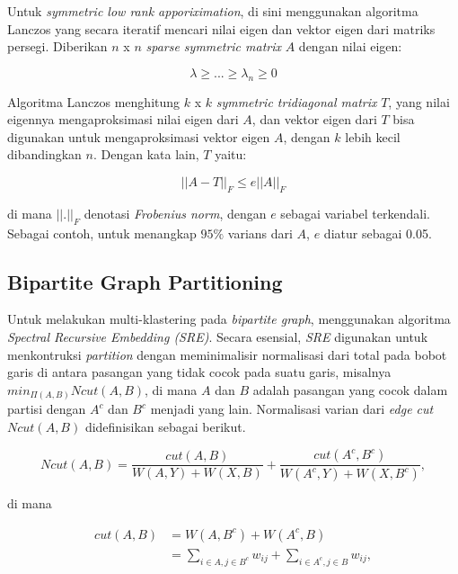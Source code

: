 Untuk \textit{symmetric low rank apporiximation}, di sini menggunakan algoritma Lanczos yang secara iteratif mencari nilai eigen dan vektor eigen dari matriks persegi. Diberikan $n$ x $n$ \textit{sparse symmetric matrix} $A$ dengan nilai eigen:

\begin{equation}
\label{lambda_lambda}
    \lambda \geq ... \geq \lambda_n \geq 0
\end{equation}

Algoritma Lanczos menghitung $k$ x $k$ \textit{symmetric tridiagonal matrix} $T$, yang nilai eigennya mengaproksimasi nilai eigen dari $A$, dan vektor eigen dari $T$ bisa digunakan untuk mengaproksimasi vektor eigen $A$, dengan $k$ lebih kecil dibandingkan $n$. Dengan kata lain, $T$ yaitu:

\begin{equation}
\label{frobenius_norm}
    ||A - T||_F \leq e||A||_F
\end{equation}

di mana $||.||_F$ denotasi \textit{Frobenius norm}, dengan \(e\) sebagai variabel terkendali. Sebagai contoh, untuk menangkap \(95 \% \) varians dari \(A\), \(e\) diatur sebagai 0.05.

\subsection{Bipartite Graph Partitioning}

Untuk melakukan multi-klastering pada \textit{bipartite graph}, \cite{song2008autotag} menggunakan algoritma \textit{Spectral Recursive Embedding (SRE)}. Secara esensial, \textit{SRE} digunakan untuk menkontruksi \textit{partition} dengan meminimalisir normalisasi dari total pada bobot garis di antara pasangan yang tidak cocok pada suatu garis, misalnya \(min_{\Pi(A,B)}Ncut(A,B)\), di mana \(A\) dan \(B\) adalah pasangan yang cocok dalam partisi dengan $A^c$ dan $B^c$ menjadi yang lain. Normalisasi varian dari \textit{edge cut} \(Ncut(A,B)\) didefinisikan sebagai berikut.

\begin{equation}
    \label{n_cut}
    Ncut(A,B) = \frac{cut(A,B)}{W(A,Y)+W(X,B)} + \frac{cut(A^c,B^c)}{W(A^c,Y)+W(X,B^c)},
\end{equation}

di mana

\begin{equation}
\begin{split}
\label{cut_ab}
    cut(A,B) &= W(A,B^c) + W(A^c, B) \\
             &= \sum_{i \in A, j \in B^c}{} w_{ij} + \sum_{i \in A^c, j \in B}{} w_{ij},
\end{split}
\end{equation}

